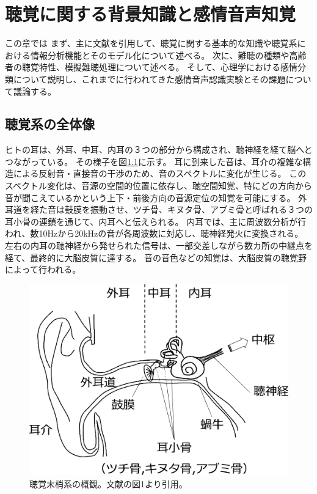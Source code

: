 
\newpage
\chapter{聴覚に関する背景知識と感情音声知覚}
\label{chap:RelatedResearch}

この章では
まず、主に文献\cite{ogushi2019Book, furukawa2021chokaku}を引用して、聴覚に関する基本的な知識や聴覚系における情報分析機能とそのモデル化について述べる。
次に、難聴の種類や高齢者の聴覚特性、模擬難聴処理について述べる。
そして、心理学における感情分類について説明し、これまでに行われてきた感情音声認識実験とその課題について議論する。


\section{聴覚系の全体像}
\label{sec:Auditory}
ヒトの耳は、外耳、中耳、内耳の３つの部分から構成され、聴神経を経て脳へとつながっている。
その様子を図\ref{fig:Hearingsystem}に示す。
耳に到来した音は、耳介の複雑な構造による反射音・直接音の干渉のため、音のスペクトルに変化が生じる。
このスペクトル変化は、音源の空間的位置に依存し、聴空間知覚、特にどの方向から音が聞こえているかという上下・前後方向の音源定位の知覚を可能にする。
外耳道を経た音は鼓膜を振動させ、ツチ骨、キヌタ骨、アブミ骨と呼ばれる３つの耳小骨の連鎖を通じて、内耳へと伝えられる。
内耳では、主に周波数分析が行われ、数10Hzから20kHzの音が各周波数に対応し、聴神経発火に変換される。
左右の内耳の聴神経から発せられた信号は、一部交差しながら数カ所の中継点を経て、最終的に大脳皮質に達する。
音の音色などの知覚は、大脳皮質の聴覚野によって行われる。

\begin{figure}[htbp]
    \vspace{40pt}
    \centering
    \includegraphics[width=0.6\hsize]{Figure/RelatedResearch/furukawa2017auditory.eps}
    \caption{聴覚末梢系の概観。文献\cite{furukawa2017chokaku}の図1より引用。}
    \label{fig:Hearingsystem}
\end{figure}


